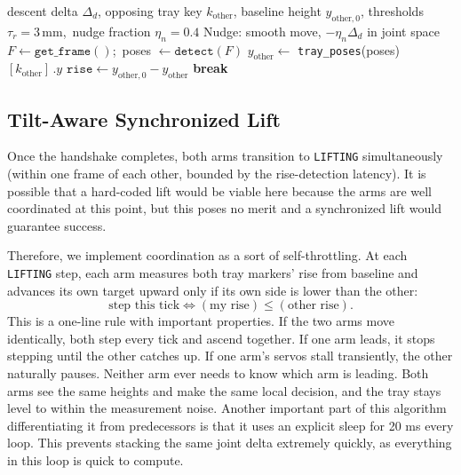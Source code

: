 \begin{algorithm} [h]
\caption{Nudge-lift (physical message passing)}
\label{algo:nudge}
\begin{algorithmic}[1]
  \REQUIRE descent delta $\Delta_d$, opposing tray key $k_{\text{other}}$,
           baseline height $y_{\text{other},0}$,
           thresholds $\tau_r=3$\,mm,\ nudge fraction $\eta_n=0.4$
  \STATE Nudge: smooth move, $-\eta_n\Delta_d$ in joint space
  \LOOP
    \STATE $F \gets \texttt{get\_frame}()$;\ poses $\gets \texttt{detect}(F)$
    \STATE $y_{\text{other}} \gets $
           \texttt{tray\_poses}(poses)$[k_{\text{other}}]\,.y$
    \STATE $\texttt{rise} \gets y_{\text{other},0} - y_{\text{other}}$
     \textbf{break} \ENDIF
  \ENDLOOP
\end{algorithmic}
\end{algorithm}

\subsection{Tilt-Aware Synchronized Lift}
\label{sec:lifting}
Once the handshake completes, both arms transition to \texttt{LIFTING} simultaneously (within one frame of each other, bounded by the rise-detection latency). It is possible that a hard-coded lift would be viable here because the arms are well coordinated at this point, but this poses no merit and a synchronized lift would guarantee success. 


Therefore, we implement coordination as a sort of self-throttling. At each \texttt{LIFTING} step, each arm measures both tray markers' rise from baseline and advances its own target upward only if its own side is lower than the other:
\begin{equation}
\label{eq:lift-gate}
  \text{step this tick} \iff
  (\text{my rise}) \le (\text{other rise}).
\end{equation}
This is a one-line rule with important properties. If the two arms move identically, both step every tick and ascend together. If one arm leads, it stops stepping until the other catches up. If one arm's servos stall transiently, the other naturally pauses. Neither arm ever needs to know which arm is leading. Both arms see the same heights and make the same local decision, and the tray stays level to within the measurement noise. Another important part of this algorithm differentiating it from predecessors is that it uses an explicit sleep for 20 ms every loop. This prevents stacking the same joint delta extremely quickly, as everything in this loop is quick to compute.

